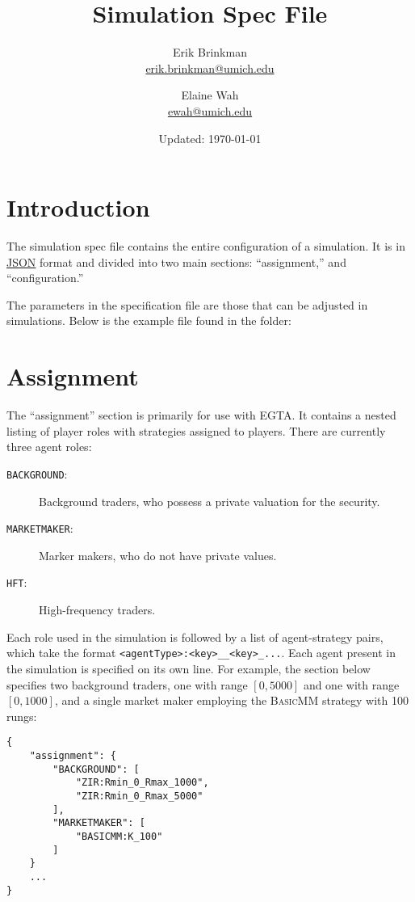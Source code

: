 \documentclass[11pt]{article}
\begin{document}
	
\title{Simulation Spec File}
\author{
  Erik Brinkman \\
  \href{mailto:erik.brinkman@umich.edu}{erik.brinkman@umich.edu}
  \and
  Elaine Wah \\
  \href{mailto:ewah@umich.edu}{ewah@umich.edu}
}
\date{Updated: \today}
\maketitle

\section{Introduction}

The simulation spec file contains the entire configuration of a simulation. It
is in \href{https://en.wikipedia.org/wiki/Json}{JSON} format and divided into
two main sections: ``assignment,'' and ``configuration.''

The parameters in the specification file are those that can be adjusted in
simulations. Below is the example  file found in
the  folder:



\section{Assignment}

The ``assignment'' section is primarily for use with EGTA. It contains a
nested listing of player roles with strategies assigned to players. 
%
There are currently three agent roles:
 \begin{description}
  \item[\texttt{BACKGROUND}:] Background traders, who possess a private valuation for the security.
  \item[\texttt{MARKETMAKER}:] Marker makers, who do not have private values.
  \item[\texttt{HFT}:] High-frequency traders.
  \end{description}

Each role used in the simulation is followed by a list of agent-strategy pairs, which take the format \texttt{<agentType>:<key>\_<value1>\_<key>\_<value2>...}. Each agent present in the simulation is specified on its own line.
%
For example, the section below specifies two background traders, one with range $[0, 5000]$ and one with range $[0, 1000]$, and a single market maker employing the \textsc{BasicMM} strategy with 100 rungs:
%
\begin{verbatim}
{
    "assignment": {
        "BACKGROUND": [
            "ZIR:Rmin_0_Rmax_1000",
            "ZIR:Rmin_0_Rmax_5000"
        ],
        "MARKETMAKER": [
            "BASICMM:K_100"
        ]
    }
    ...
}
\end{verbatim}
\end{document}
